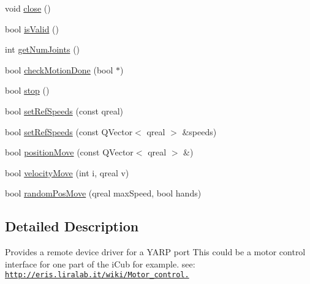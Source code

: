 \begin{DoxyCompactItemize}
\item 
void \hyperlink{class_robot_model_1_1_part_controller_a2042c9595ee1dd1e87f0095bc10cc2be}{close} ()
\item 
bool \hyperlink{class_robot_model_1_1_part_controller_a03d04564ed45e8f991075a059a5d557f}{isValid} ()
\item 
int \hyperlink{class_robot_model_1_1_part_controller_a2fb04bfb6b1da63201fdaf3dac6591dc}{getNumJoints} ()
\item 
bool \hyperlink{class_robot_model_1_1_part_controller_aeebcb6a50ff927c552f6e41cc355902b}{checkMotionDone} (bool $\ast$)
\item 
bool \hyperlink{class_robot_model_1_1_part_controller_aeb479f7ffd70c0cf80beabf38b1073f7}{stop} ()
\item 
bool \hyperlink{class_robot_model_1_1_part_controller_a8fda7fd0b7914ec93b349b0b11f8d757}{setRefSpeeds} (const qreal)
\item 
bool \hyperlink{class_robot_model_1_1_part_controller_a5481c9f2cbbd8370fd2e5b62c38c7d2f}{setRefSpeeds} (const QVector$<$ qreal $>$ \&speeds)
\item 
bool \hyperlink{class_robot_model_1_1_part_controller_a9ab9fab080b18fa2fe162ccedb928460}{positionMove} (const QVector$<$ qreal $>$ \&)
\item 
bool \hyperlink{class_robot_model_1_1_part_controller_a8ac6b4519903ab433a7474e0491333f3}{velocityMove} (int i, qreal v)
\item 
bool \hyperlink{class_robot_model_1_1_part_controller_aa7dfbc575182f6eeb56c4190ea0e50f7}{randomPosMove} (qreal maxSpeed, bool hands)
\end{DoxyCompactItemize}


\subsection{Detailed Description}
Provides a remote device driver for a YARP port This could be a motor control interface for one part of the iCub for example. see: \href{http://eris.liralab.it/wiki/Motor_control.}{\tt http://eris.liralab.it/wiki/Motor\_\-control.} 


